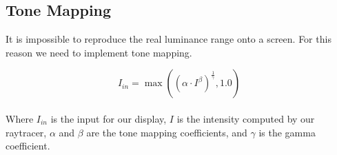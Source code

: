 \documentclass{article}
\begin{document}
\subsection{Tone Mapping}
It is impossible to reproduce the real luminance range onto a screen. For this reason we need to implement tone mapping.

\[ I_{in} = \max((\alpha \cdot I^\beta)^{\frac{1}{\gamma}}, 1.0) \] \\
Where $I_{in}$ is the input for our display, $I$ is the intensity computed by our raytracer, $\alpha$ and $\beta$ are the tone mapping coefficients, and $\gamma$ is the gamma coefficient.
\end{document}
